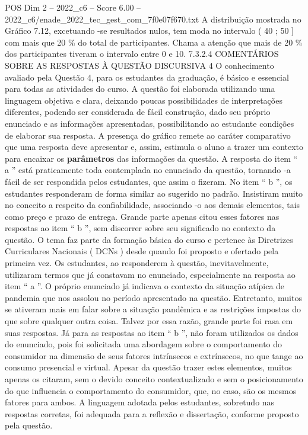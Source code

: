 \begin{textsample}{POS Dim 2 – 2022\_c6 – Score 6.00 – 2022\_c6/enade\_2022\_tec\_gest\_com\_7f0e07f670.txt}
A distribuição mostrada no Gráfico 7.12, excetuando -se resultados nulos, tem moda no intervalo ( 40 ; 50 ] com mais que 20 \% do total de participantes.
Chama a atenção que mais de 20 \% dos participantes tiveram o intervalo entre 0 e 10. 7.3.2.4 COMENTÁRIOS SOBRE AS RESPOSTAS À QUESTÃO DISCURSIVA 4 O conhecimento avaliado pela Questão 4, para os estudantes da graduação, é básico e essencial para todas as atividades do curso.
A questão foi elaborada utilizando uma linguagem objetiva e clara, deixando poucas possibilidades de interpretações diferentes, podendo ser considerada de fácil construção, dado seu próprio enunciado e as informações apresentadas, possibilitando ao estudante condições de elaborar sua resposta.
A presença do gráfico remete ao caráter comparativo que uma resposta deve apresentar e, assim, estimula o aluno a trazer um contexto para encaixar os \textbf{parâmetros} das informações da questão.
A resposta do item “ a ” está praticamente toda contemplada no enunciado da questão, tornando -a fácil de ser respondida pelos estudantes, que assim o fizeram.
No item “ b ”, os estudantes responderam de forma similar ao sugerido no padrão.
Insistiram muito no conceito a respeito da confiabilidade, associando -o aos demais elementos, tais como preço e prazo de entrega.
Grande parte apenas citou esses fatores nas respostas ao item “ b ”, sem discorrer sobre seu significado no contexto da questão.
O tema faz parte da formação básica do curso e pertence às Diretrizes Curriculares Nacionais ( DCNs ) desde quando foi proposto e ofertado pela primeira vez.
Os estudantes, ao responderem à questão, inevitavelmente, utilizaram termos que já constavam no enunciado, especialmente na resposta ao item “ a ”.
O próprio enunciado já indicava o contexto da situação atípica de pandemia que nos assolou no período apresentado na questão.
Entretanto, muitos se ativeram mais em falar sobre a situação pandêmica e as restrições impostas do que sobre qualquer outra coisa.
Talvez por essa razão, grande parte foi rasa em suas respostas.
Já para as respostas ao item “ b ”, não foram utilizados os dados do enunciado, pois foi solicitada uma abordagem sobre o comportamento do consumidor na dimensão de seus fatores intrínsecos e extrínsecos, no que tange ao consumo presencial e virtual.
Apesar da questão trazer estes elementos, muitos apenas os citaram, sem o devido conceito contextualizado e sem o posicionamento do que influencia o comportamento do consumidor, que, no caso, são os mesmos fatores para ambos.
A linguagem adotada pelos estudantes, sobretudo nas respostas corretas, foi adequada para a reflexão e dissertação, conforme proposto pela questão.

\end{textsample}
